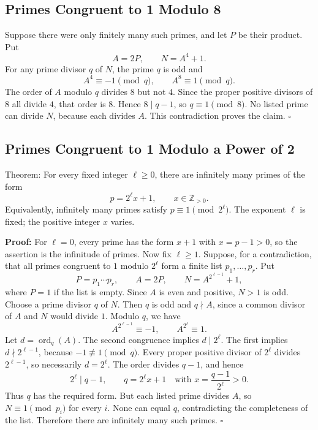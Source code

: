 \documentclass[a4paper,11pt,abstracton]{scrartcl}
\theoremstyle{dotlessP}
\theoremstyle{dotlessS}
\theoremstyle{remark}
\theoremstyle{definition}
\begin{document}
\subsection{Primes Congruent to 1 Modulo 8}

Suppose there were only finitely many such primes, and let $P$ be
their product. Put
\[
    A=2P,\qquad N=A^4+1.
\]
For any prime divisor $q$ of $N$, the prime $q$ is odd and
\[
    A^4\equiv-1\pmod q,\qquad A^8\equiv1\pmod q.
\]
The order of $A$ modulo $q$ divides $8$ but not $4$. Since the proper
positive divisors of $8$ all divide $4$, that order is $8$.
Hence $8\mid q-1$, so $q\equiv1\pmod8$.
No listed prime can divide $N$, because each divides $A$.
This contradiction proves the claim.
\hfill$\square$

\subsection{Primes Congruent to 1 Modulo a Power of 2}

\begin{mainbox}{Theorem:}
For every fixed integer $\ell\geq0$, there are infinitely many primes
of the form
\[
    p=2^\ell x+1,\qquad x\in\mathbb{Z}_{>0}.
\]
Equivalently, infinitely many primes satisfy $p\equiv1\pmod{2^\ell}$.
The exponent $\ell$ is fixed; the positive integer $x$ varies.
\end{mainbox}

\textbf{Proof:}
For $\ell=0$, every prime has the form $x+1$ with $x=p-1>0$,
so the assertion is the infinitude of primes.
Now fix $\ell\geq1$. Suppose, for a contradiction, that all primes
congruent to $1$ modulo $2^\ell$ form a finite list
$p_1,\ldots,p_r$. Put
\[
    P=p_1\cdots p_r,\qquad A=2P,\qquad
    N=A^{2^{\ell-1}}+1,
\]
where $P=1$ if the list is empty. Since $A$ is even and positive,
$N>1$ is odd. Choose a prime divisor $q$ of $N$.
Then $q$ is odd and $q\nmid A$, since a common divisor of $A$ and
$N$ would divide $1$. Modulo $q$, we have
\[
    A^{2^{\ell-1}}\equiv-1,\qquad A^{2^\ell}\equiv1.
\]
Let $d=\operatorname{ord}_q(A)$. The second congruence implies
$d\mid2^\ell$. The first implies $d\nmid2^{\ell-1}$, because
$-1\not\equiv1\pmod q$. Every proper positive divisor of $2^\ell$
divides $2^{\ell-1}$, so necessarily $d=2^\ell$.
The order divides $q-1$, and hence
\[
    2^\ell\mid q-1,\qquad
    q=2^\ell x+1\quad\text{with }x=\frac{q-1}{2^\ell}>0.
\]
Thus $q$ has the required form. But each listed prime divides $A$,
so $N\equiv1\pmod{p_i}$ for every $i$. None can equal $q$,
contradicting the completeness of the list.
Therefore there are infinitely many such primes.
\hfill$\square$
\end{document}
